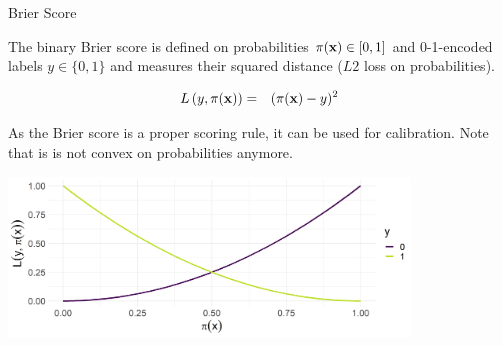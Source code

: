 \documentclass[11pt,compress,t,notes=noshow, xcolor=table]{beamer}
\begin{document}

\begin{vbframe}{Brier Score}

The binary Brier score is defined on probabilities $\pi(\mathbf{x}) \in [0, 1]$ and 0-1-encoded labels $y \in \{0, 1\}$ and measures their squared distance ($L2$ loss on probabilities).

\begin{eqnarray*}
L\left(y, \pi(\mathbf{x})\right) &=& (\pi(\mathbf{x}) - y)^2
\end{eqnarray*}

As the Brier score is a proper scoring rule, it can be used for calibration. Note that is is not convex on probabilities anymore.

\begin{center}
\includegraphics[width = 0.8\textwidth]{figure/plot_brier.png}
\end{center}


\end{vbframe}
\end{document}
